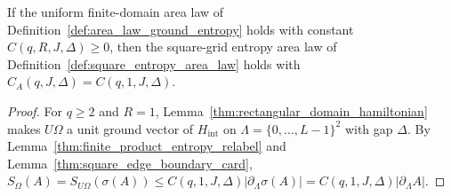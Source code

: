 \begin{lemma}
    \label{thm:square_area_law_from_uniform}
    \leanok
    If the uniform finite-domain area law of
    Definition~\ref{def:area_law_ground_entropy} holds with constant
    $C(q,R,J,\Delta)\ge0$, then the square-grid entropy area law of
    Definition~\ref{def:square_entropy_area_law} holds with
    $C_A(q,J,\Delta)=C(q,1,J,\Delta)$.
\end{lemma}
\begin{proof}\leanok
    For $q\ge2$ and $R=1$, Lemma~\ref{thm:rectangular_domain_hamiltonian}
    makes $U\Omega$ a unit ground
    vector of $H_{\mathrm{int}}$ on $\Lambda=\{0,\ldots,L-1\}^2$ with gap
    $\Delta$. By Lemma~\ref{thm:finite_product_entropy_relabel} and
    Lemma~\ref{thm:square_edge_boundary_card},
    $S_\Omega(A)=S_{U\Omega}(\sigma(A))\le C(q,1,J,\Delta)|\partial_\Lambda\sigma(A)|
        =C(q,1,J,\Delta)|\partial_\Lambda A|$.
\end{proof}

